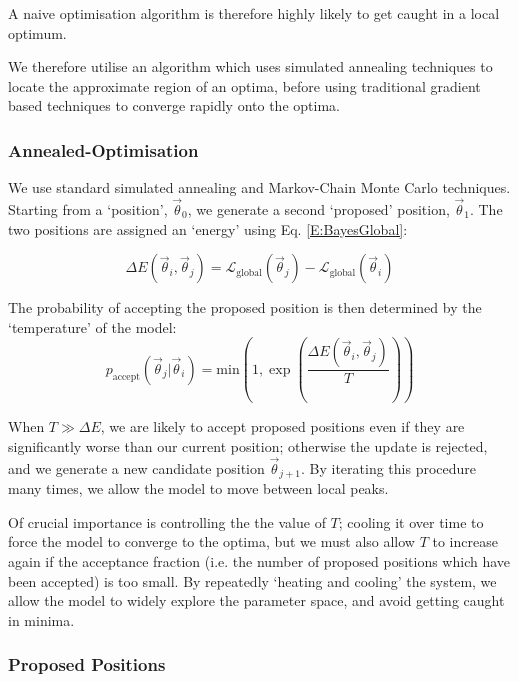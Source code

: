 \documentclass[fleqn,usenatbib]{mnras}
\newcommand{\eref}[1]{Eq. \eqref{#1}}
\begin{document}
{				A naive optimisation algorithm is therefore highly likely to get caught in a local optimum. 

				We therefore utilise an algorithm which uses simulated annealing techniques to locate the approximate region of an optima, before using traditional gradient based techniques to converge rapidly onto the optima.

				\subsubsection{Annealed-Optimisation}

					We use standard simulated annealing and Markov-Chain Monte Carlo techniques. Starting from a `position', $\vec{\theta}_0$, we generate a second `proposed' position, $\vec{\theta}_1$.  The two positions are assigned an `energy' using \eref{E:BayesGlobal}:

					\begin{equation}
						\Delta E(\vec{\theta}_i, \vec{\theta}_j) = \mathcal{L}_\text{global}(\vec{\theta}_j) - \mathcal{L}_\text{global}(\vec{\theta}_i)
					\end{equation}

					The probability of accepting the proposed position is then determined by the `temperature' of the model:
					\begin{equation}
						p_\text{accept}(\vec{\theta}_j | \vec{\theta}_i) = \text{min}\left(1, \exp\left( \frac{\Delta E(\vec{\theta}_i, \vec{\theta}_j)}{T} \right)\right)
					\end{equation}

					When $T \gg \Delta E$, we are likely to accept proposed positions even if they are significantly worse than our current position; otherwise the update is rejected, and we generate a new candidate position $\vec{\theta}_{j+1}$. By iterating this procedure many times, we allow the model to move between local peaks. 

					Of crucial importance is controlling the the value of $T$; cooling it over time to force the model to converge to the optima, but we must also allow $T$ to increase again if the acceptance fraction (i.e. the number of proposed positions which have been accepted) is too small. By repeatedly `heating and cooling' the system, we allow the model to widely explore the parameter space, and avoid getting caught in minima.

				\subsubsection{Proposed Positions}

}
\end{document}
